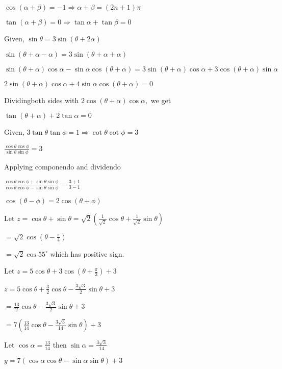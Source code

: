   $\cos(\alpha + \beta) = -1 \Rightarrow \alpha + \beta = (2n + 1)\pi$

  $\tan(\alpha + \beta) = 0 \Rightarrow \tan \alpha + \tan \beta = 0$

\item Given, $\sin\theta = 3\sin(\theta + 2\alpha)$

  $\sin(\theta + \alpha - \alpha) = 3\sin(\theta + \alpha + \alpha)$

  $\sin(\theta + \alpha)\cos\alpha - \sin\alpha\cos(\theta + \alpha) = 3\sin(\theta + \alpha)\cos\alpha + 3\cos(\theta +
  \alpha)\sin\alpha$

  $2\sin(\theta + \alpha)\cos\alpha + 4\sin\alpha\cos(\theta + \alpha) = 0$

  Dividingboth sides with $2\cos(\theta + \alpha)\cos\alpha,$ we get

  $\tan(\theta + \alpha) + 2\tan\alpha = 0$

\item Given, $3\tan\theta\tan\phi = 1 \Rightarrow \cot\theta\cot\phi = 3$

  $\frac{\cos\theta\cos\phi}{\sin\theta\sin\phi} = 3$

  Applying componendo and dividendo

  $\frac{\cos\theta\cos\phi + \sin\theta\sin\phi}{\cos\theta\cos\phi - \sin\theta\sin\phi} = \frac{3 + 1}{3 - 1}$

  $\cos(\theta - \phi) = 2\cos(\theta + \phi)$

\item Let $z = \cos\theta + \sin\theta = \sqrt{2}\left(\frac{1}{\sqrt{2}}\cos\theta + \frac{1}{\sqrt{2}}\sin\theta\right)$

  $= \sqrt{2}\cos\left(\theta - \frac{\pi}{4}\right)$

  $= \sqrt{2}\cos 55^\circ$ which has positive sign.

\item Let $z = 5\cos\theta + 3\cos\left(\theta + \frac{\pi}{3}\right) + 3$

  $z = 5\cos\theta + \frac{3}{2}\cos\theta - \frac{3\sqrt{3}}{2}\sin\theta + 3$

  $= \frac{13}{2}\cos\theta - \frac{3\sqrt{3}}{2}\sin\theta + 3$

  $= 7\left(\frac{13}{14}\cos\theta - \frac{3\sqrt{3}}{14}\sin\theta\right) + 3$

  Let $\cos\alpha = \frac{13}{14}$ then $\sin\alpha = \frac{3\sqrt{3}}{14}$

  $y = 7(\cos\alpha\cos\theta - \sin\alpha\sin\theta) + 3$

